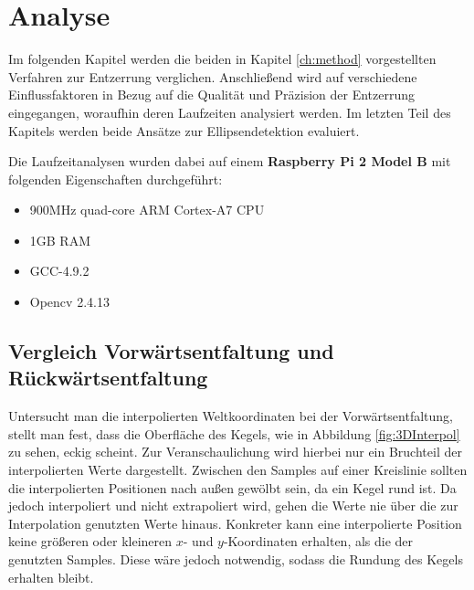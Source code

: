 \chapter{Analyse}
\label{ch:analysis}

Im folgenden Kapitel werden die beiden in Kapitel \ref{ch:method} vorgestellten Verfahren zur Entzerrung verglichen. Anschließend wird auf verschiedene Einflussfaktoren in Bezug auf die Qualität und Präzision der Entzerrung eingegangen, woraufhin deren Laufzeiten analysiert werden. Im letzten Teil des Kapitels werden beide Ansätze zur Ellipsendetektion evaluiert.


Die Laufzeitanalysen wurden dabei auf einem \textbf{Raspberry Pi 2 Model B} mit folgenden Eigenschaften durchgeführt:
\begin{itemize}
	\item 900MHz quad-core ARM Cortex-A7 CPU
	\item 1GB RAM
	\item GCC-4.9.2
	\item Opencv 2.4.13
\end{itemize}


\section{Vergleich Vorwärtsentfaltung und Rückwärtsentfaltung}
Untersucht man die interpolierten Weltkoordinaten bei der Vorwärtsentfaltung, stellt man fest, dass die Oberfläche des Kegels,  wie in Abbildung \ref{fig:3DInterpol} zu sehen, eckig scheint. Zur Veranschaulichung wird hierbei nur ein Bruchteil der interpolierten Werte dargestellt. Zwischen den Samples auf einer Kreislinie sollten die interpolierten Positionen nach außen gewölbt sein, da ein Kegel rund ist. Da jedoch interpoliert und nicht extrapoliert wird, gehen die Werte nie über die zur Interpolation genutzten Werte hinaus. Konkreter kann eine interpolierte Position keine größeren oder kleineren $x$- und $y$-Koordinaten erhalten, als die der genutzten Samples. Diese wäre jedoch notwendig, sodass die Rundung des Kegels erhalten bleibt.

